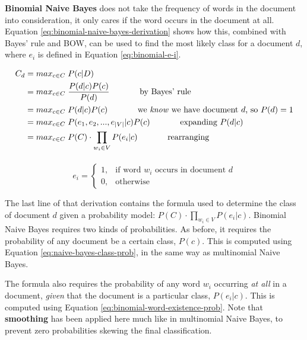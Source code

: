 \documentclass{article}
\begin{document}
\textbf{Binomial Naive Bayes} does not take the frequency of words in the document into consideration, it only cares if the word occurs in the document at all. Equation \ref{eq:binomial-naive-bayes-derivation} shows how this, combined with Bayes' rule and BOW, can be used to find the most likely class for a document $d$, where $e_i$ is defined in Equation \ref{eq:binomial-e-i}.

\begin{equation}
\begin{aligned}[b]
	C_{d} &= max_{c \in C} \; P(c|D) \\
	&= max_{c \in C} \; \frac{P(d|c)P(c)}{P(d)} 
	\;\;\;\;\;\;\;\;\;\;\;\;\; \text{by Bayes' rule} \\
	&= max_{c \in C} \; P(d|c)P(c) 
	\;\;\;\;\;\;\;\;\;\;\;\;\; \text{we \textit{know} we have document }d\text{, so } P(d) = 1 \\
	&= max_{c \in C} \; P(e_1,e_2,...,e_{|V|}| c)P(c)
	\;\;\;\;\;\;\;\;\;\;\;\;\; \text{expanding }P(d|c) \\	
	&= max_{c \in C} \; P(C) \cdot \prod_{w_i \in V} {P(e_i|c)}
	\;\;\;\;\;\;\;\;\;\;\;\;\; \text{rearranging} \\
\end{aligned}
\label{eq:binomial-naive-bayes-derivation}
\end{equation}

\begin{equation}
	e_i = \begin{cases}
		1,& \text{if word }w_i\text{ occurs in document }d \\
		0,& \text{otherwise}
	\end{cases}
	\label{eq:binomial-e-i}
\end{equation}

The last line of that derivation contains the formula used to determine the class of document $d$ given a probability model:  $P(C) \cdot \prod_{w_i \in V} {P(e_i|c)}$. Binomial Naive Bayes requires two kinds of probabilities. As before, it requires the probability of any document be a certain class, $P(c)$. This is computed using Equation \ref{eq:naive-bayes-class-prob}, in the same way as multinomial Naive Bayes.

The formula also requires the probability of any word $w_i$ occurring \textit{at all} in a document, \textit{given} that the document is a particular class, $P(e_i|c)$. This is computed using Equation \ref{eq:binomial-word-existence-prob}. Note that \textbf{smoothing} has been applied here much like in multinomial Naive Bayes, to prevent zero probabilities skewing the final classification.
\end{document}
